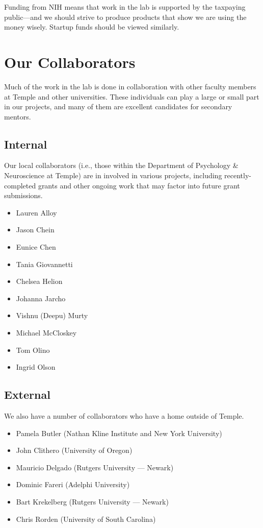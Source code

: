\documentclass[letterpaper,11pt,oneside]{memoir}
\begin{document}
Funding from NIH means that work in the lab is supported by the taxpaying public---and we should strive to produce products that show we are using the money wisely. Startup funds should be viewed similarly. 


\section{Our Collaborators}

Much of the work in the lab is done in collaboration with other faculty members at Temple and other universities. These individuals can play a large or small part in our projects, and many of them are excellent candidates for secondary mentors. 

\subsection{Internal}

Our local collaborators (i.e., those within the Department of Psychology \& Neuroscience at Temple) are in involved in various projects, including recently-completed grants and other ongoing work that may factor into future grant submissions. 

\begin{multicols}{2}
\begin{itemize}[noitemsep,nolistsep]
\item Lauren Alloy
\item Jason Chein
\item Eunice Chen
\item Tania Giovannetti
\item Chelsea Helion
\item Johanna Jarcho
\item Vishnu (Deepu) Murty
\item Michael McCloskey
\item Tom Olino
\item Ingrid Olson
\end{itemize}
\end{multicols}

\subsection{External}

We also have a number of collaborators who have a home outside of Temple. \\

\begin{itemize}[noitemsep,nolistsep]
\item Pamela Butler (Nathan Kline Institute and New York University)
\item John Clithero (University of Oregon)
\item Mauricio Delgado (Rutgers University --- Newark)
\item Dominic Fareri (Adelphi University)
\item Bart Krekelberg (Rutgers University --- Newark)
\item Chris Rorden (University of South Carolina) 
\end{itemize}
\end{document}
